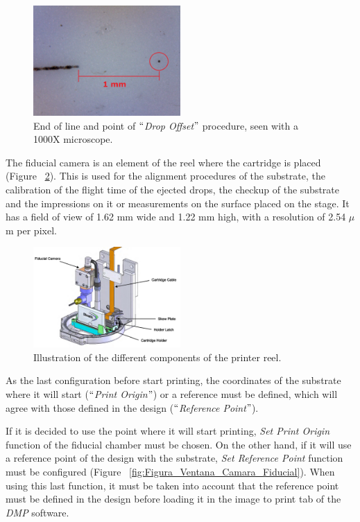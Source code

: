 \begin{figure}[H]
  \centering
    \includegraphics[width=0.5\textwidth]{Figures/Figura_prueba_Drop_Spacing}
  \caption{End of line and point of $``$\textit{Drop Offset}$"$ procedure, seen with a 1000X microscope.}
  \label{fig:Figura_prueba_Drop_Spacing}
\end{figure}

The fiducial camera is an element of the reel where the cartridge is placed (Figure ~\ref{fig:Figura_Camara_Fiducial}). This is used for the alignment procedures of the substrate, the calibration of the flight time of the ejected drops, the checkup of the substrate and the impressions on it or measurements on the surface placed on the stage. It has a field of view of 1.62 mm wide and 1.22 mm high, with a resolution of 2.54 $\mu$m per pixel.

\begin{figure}[H]
  \centering
    \includegraphics[width=0.5\textwidth]{Figures/Figura_Camara_Fiducial}
  \caption{Illustration of the different components of the printer reel.}
  \label{fig:Figura_Camara_Fiducial}
\end{figure}

As the last configuration before start printing, the coordinates of the substrate where it will start ($``$\textit{Print Origin}$"$) or a reference must be defined, which will agree with those defined in the design ($``$\textit{Reference Point}$"$).

If it is decided to use the point where it will start printing, \textit{Set Print Origin} function of the fiducial chamber must be chosen. On the other hand, if it will use a reference point of the design with the substrate, \textit{Set Reference Point} function must be configured (Figure ~\ref{fig:Figura_Ventana_Camara_Fiducial}). When using this last function, it must be taken into account that the reference point must be defined in the design before loading it in the image to print tab of the \textit{DMP} software.

